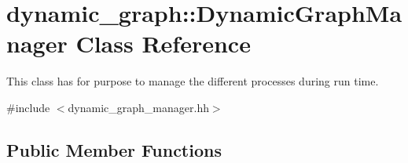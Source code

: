 \hypertarget{classdynamic__graph_1_1DynamicGraphManager}{}\section{dynamic\+\_\+graph\+:\+:Dynamic\+Graph\+Manager Class Reference}
\label{classdynamic__graph_1_1DynamicGraphManager}


This class has for purpose to manage the different processes during run time.  




{\ttfamily \#include $<$dynamic\+\_\+graph\+\_\+manager.\+hh$>$}

\subsection*{Public Member Functions}
